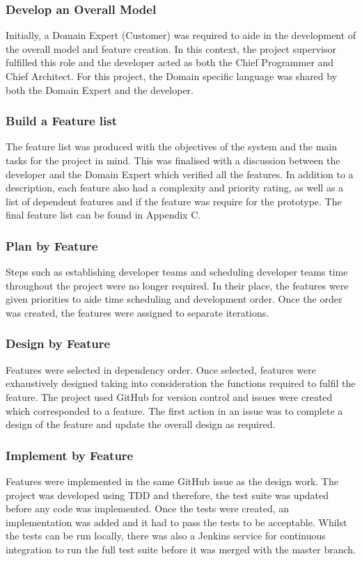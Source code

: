 \subsubsection{Develop an Overall Model}
Initially, a Domain Expert (Customer) was required to aide in the development of the overall model and feature creation. In this context, the project supervisor fulfilled this role and the developer acted as both the Chief Programmer and Chief Architect. For this project, the Domain specific language was shared by both the Domain Expert and the developer.

\subsubsection{Build a Feature list}
The feature list was produced with the objectives of the system and  the main tasks for the project in mind. This was finalised with a discussion between the developer and the Domain Expert which verified all the features. In addition to a description, each feature also had a complexity and priority rating, as well as a list of dependent features and if the feature was require for the prototype. The final feature list can be found in Appendix C. 

\subsubsection{Plan by Feature}
Steps such as establishing developer teams and scheduling developer teams time throughout the project were no longer required. In their place, the features were given priorities to aide time scheduling and development order. Once the order was created, the features were assigned to separate iterations.

\subsubsection{Design by Feature}
Features were selected in dependency order. Once selected, features were exhaustively designed taking into consideration the functions required to fulfil the feature. The project used GitHub for version control and issues were created which corresponded to a feature. The first action in an issue was to complete a design of the feature and update the overall design as required.

\subsubsection{Implement by Feature}
Features were implemented in the same GitHub issue as the design work. The project was developed using TDD and therefore, the test suite was updated before any code was implemented. Once the tests were created, an implementation was added and it had to pass the tests to be acceptable. Whilst the tests can be run locally, there was also a Jenkins service for continuous integration to run the full test suite before it was merged with the master branch.  
